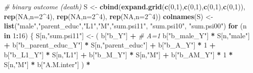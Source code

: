 \documentclass[
]{book}
\newenvironment{Shaded}{\begin{snugshade}}{\end{snugshade}}
\newcommand{\AttributeTok}[1]{\textcolor[rgb]{0.13,0.29,0.53}{#1}}
\newcommand{\CommentTok}[1]{\textcolor[rgb]{0.56,0.35,0.01}{\textit{#1}}}
\newcommand{\ConstantTok}[1]{\textcolor[rgb]{0.56,0.35,0.01}{#1}}
\newcommand{\ControlFlowTok}[1]{\textcolor[rgb]{0.13,0.29,0.53}{\textbf{#1}}}
\newcommand{\DecValTok}[1]{\textcolor[rgb]{0.00,0.00,0.81}{#1}}
\newcommand{\FunctionTok}[1]{\textcolor[rgb]{0.13,0.29,0.53}{\textbf{#1}}}
\newcommand{\NormalTok}[1]{#1}
\newcommand{\OtherTok}[1]{\textcolor[rgb]{0.56,0.35,0.01}{#1}}
\newcommand{\SpecialCharTok}[1]{\textcolor[rgb]{0.81,0.36,0.00}{\textbf{#1}}}
\newcommand{\StringTok}[1]{\textcolor[rgb]{0.31,0.60,0.02}{#1}}
\begin{document}
\begin{Shaded}
\begin{Highlighting}[]
  \CommentTok{\# binary outcome (death)}
\NormalTok{  S }\OtherTok{\textless{}{-}} \FunctionTok{cbind}\NormalTok{(}\FunctionTok{expand.grid}\NormalTok{(}\FunctionTok{c}\NormalTok{(}\DecValTok{0}\NormalTok{,}\DecValTok{1}\NormalTok{),}\FunctionTok{c}\NormalTok{(}\DecValTok{0}\NormalTok{,}\DecValTok{1}\NormalTok{),}\FunctionTok{c}\NormalTok{(}\DecValTok{0}\NormalTok{,}\DecValTok{1}\NormalTok{),}\FunctionTok{c}\NormalTok{(}\DecValTok{0}\NormalTok{,}\DecValTok{1}\NormalTok{)), }\FunctionTok{rep}\NormalTok{(}\ConstantTok{NA}\NormalTok{,}\AttributeTok{n=}\DecValTok{2}\SpecialCharTok{\^{}}\DecValTok{4}\NormalTok{), }
             \FunctionTok{rep}\NormalTok{(}\ConstantTok{NA}\NormalTok{,}\AttributeTok{n=}\DecValTok{2}\SpecialCharTok{\^{}}\DecValTok{4}\NormalTok{), }\FunctionTok{rep}\NormalTok{(}\ConstantTok{NA}\NormalTok{,}\AttributeTok{n=}\DecValTok{2}\SpecialCharTok{\^{}}\DecValTok{4}\NormalTok{))}
  \FunctionTok{colnames}\NormalTok{(S) }\OtherTok{\textless{}{-}} \FunctionTok{list}\NormalTok{(}\StringTok{"male"}\NormalTok{,}\StringTok{"parent\_educ"}\NormalTok{,}\StringTok{"L1"}\NormalTok{,}\StringTok{"M"}\NormalTok{,}\StringTok{"sum.psi11"}\NormalTok{, }
                      \StringTok{"sum.psi10"}\NormalTok{, }\StringTok{"sum.psi00"}\NormalTok{)}
  \ControlFlowTok{for}\NormalTok{ (n }\ControlFlowTok{in} \DecValTok{1}\SpecialCharTok{:}\DecValTok{16}\NormalTok{) \{}
\NormalTok{    S[n,}\StringTok{"sum.psi11"}\NormalTok{] }\OtherTok{\textless{}{-}}\NormalTok{  ( b[}\StringTok{"b\_Y"}\NormalTok{] }\SpecialCharTok{+}                                           \CommentTok{\# A=1}
\NormalTok{                             b[}\StringTok{"b\_male\_Y"}\NormalTok{] }\SpecialCharTok{*}\NormalTok{ S[n,}\StringTok{"male"}\NormalTok{] }\SpecialCharTok{+} 
\NormalTok{                             b[}\StringTok{"b\_parent\_educ\_Y"}\NormalTok{] }\SpecialCharTok{*}\NormalTok{ S[n,}\StringTok{"parent\_educ"}\NormalTok{] }\SpecialCharTok{+} 
\NormalTok{                             b[}\StringTok{"b\_A\_Y"}\NormalTok{] }\SpecialCharTok{*} \DecValTok{1} \SpecialCharTok{+} 
\NormalTok{                             b[}\StringTok{"b\_L1\_Y"}\NormalTok{] }\SpecialCharTok{*}\NormalTok{ S[n,}\StringTok{"L1"}\NormalTok{] }\SpecialCharTok{+}
\NormalTok{                             b[}\StringTok{"b\_M\_Y"}\NormalTok{] }\SpecialCharTok{*}\NormalTok{ S[n,}\StringTok{"M"}\NormalTok{] }\SpecialCharTok{+}
\NormalTok{                             b[}\StringTok{"b\_AM\_Y"}\NormalTok{] }\SpecialCharTok{*} \DecValTok{1} \SpecialCharTok{*}\NormalTok{ S[n,}\StringTok{"M"}\NormalTok{] }\SpecialCharTok{*}\NormalTok{ b[}\StringTok{"A.M.inter"}\NormalTok{] ) }\SpecialCharTok{*}

\end{Highlighting}
\end{Shaded}
\end{document}
